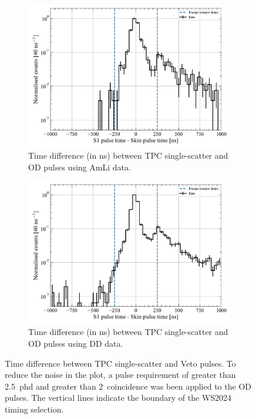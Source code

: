 \begin{figure}[!ht]
	\centering
	\begin{subfigure}[b]{0.48\textwidth}
		\centering
		\includegraphics[width=\textwidth]{figures/VetoEfficiency/SkinpromptWindowTiming_AmLi.pdf}
		\caption{Time difference (in ns) between TPC single-scatter and OD pulses using AmLi data.}
		\label{fig:VetoEff/skin_prompt_window_AmLi}
	\end{subfigure}
	\hfill
	\begin{subfigure}[b]{0.48\textwidth}
		\centering
		\includegraphics[width=\textwidth]{figures/VetoEfficiency/SkinpromptWindowTiming_DD.pdf}
		\caption{Time difference (in ns) between TPC single-scatter and OD pulses using DD data.}
		\label{fig:VetoEff/skin_prompt_window_DD}
	\end{subfigure}
	\caption{Time difference between TPC single-scatter and Veto pulses. To reduce the noise in the plot, a pulse requirement of greater than 2.5~phd and greater than 2~coincidence was been applied to the OD pulses. The vertical lines indicate the boundary of the WS2024 timing selection.}
	\label{fig:VetoEff/veto_prompt_window_Skin}
\end{figure}


